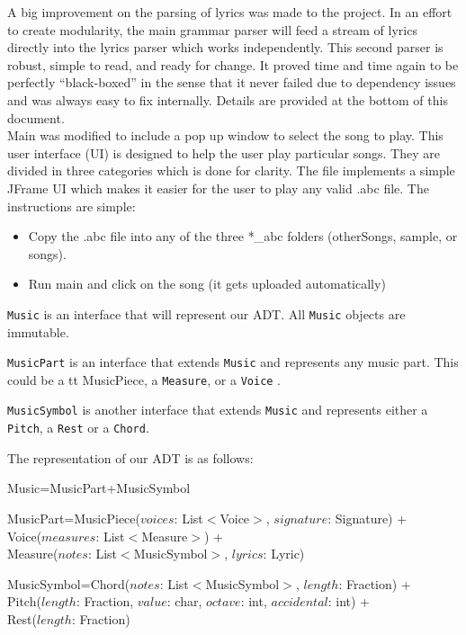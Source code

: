 \documentclass[12pt]{book}
\begin{document}
A big improvement on the parsing of lyrics was made to the project. In an effort to create modularity, the main grammar parser will feed a stream of lyrics directly into the lyrics parser which works independently. This second parser is robust, simple to read, and ready for change. It proved time and time again to be perfectly ``black-boxed'' in the sense that it never failed due to dependency issues and was always easy to fix internally. Details are provided at the bottom of this document.\\

Main was modified to include a pop up window to select the song to play. This user interface (UI) is designed to help the user play particular songs. They are divided in three categories which is done for clarity. 
The file implements a simple JFrame UI which makes it easier for the user to play any valid .abc file. The instructions are simple:

\begin{itemize}
\item Copy the .abc file into any of the three *\_abc folders (otherSongs, sample, or songs).
\item Run main and click on the song (it gets uploaded automatically)
\end{itemize}


\bigskip
 {\tt Music} is an interface that will represent our ADT. All {\tt Music} objects are immutable. 

 {\tt MusicPart} is an interface that extends {\tt Music} and represents any music part. This could be a {tt MusicPiece}, a {\tt Measure}, or a {\tt Voice} . 

 {\tt MusicSymbol} is another interface that extends {\tt Music} and represents  either a {\tt Pitch}, a {\tt Rest} or a {\tt Chord}.

The representation of our ADT is as follows:


\bigskip
\noindent  Music=MusicPart+MusicSymbol
\medskip

      \noindent MusicPart=MusicPiece($voices$: List$<$Voice$>$, $signature$: Signature) +
 \\ \phantom{MusicPart=}Voice($measures$: List$<$Measure$>$) +
 \\ \phantom{MusicPart=}Measure($notes$: List$<$MusicSymbol$>$, $lyrics$: Lyric)

\medskip

      \noindent MusicSymbol=Chord($notes$: List$<$MusicSymbol$>$, $length$: Fraction) +
 \\ \phantom{MusicSymbol=}Pitch($length$: Fraction, $value$: char, $octave$: int, $accidental$: int) +
 \\ \phantom{MusicSymbol=}Rest($length$: Fraction)
\end{document}
